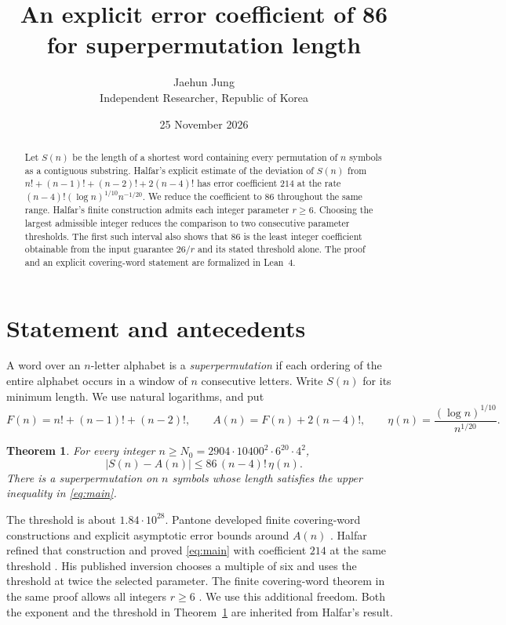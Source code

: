 \documentclass[11pt]{article}
\title{An explicit error coefficient of 86\\for superpermutation length}
\author{Jaehun Jung\\[4pt]{\small Independent Researcher, Republic of Korea}}
\date{25 November 2026}
\newtheorem{theorem}{Theorem}
\begin{document}
\maketitle

\begin{abstract}
Let \(S(n)\) be the length of a shortest word containing every permutation of \(n\) symbols as a contiguous substring. Halfar's explicit estimate of the deviation of \(S(n)\) from \(n!+(n-1)!+(n-2)!+2(n-4)!\) has error coefficient \(214\) at the rate \((n-4)!(\log n)^{1/10}n^{-1/20}\). We reduce the coefficient to \(86\) throughout the same range. Halfar's finite construction admits each integer parameter \(r\ge6\). Choosing the largest admissible integer reduces the comparison to two consecutive parameter thresholds. The first such interval also shows that \(86\) is the least integer coefficient obtainable from the input guarantee \(26/r\) and its stated threshold alone. The proof and an explicit covering-word statement are formalized in Lean~4.
\end{abstract}

\section{Statement and antecedents}
A word over an \(n\)-letter alphabet is a \emph{superpermutation} if each ordering of the entire alphabet occurs in a window of \(n\) consecutive letters. Write \(S(n)\) for its minimum length. We use natural logarithms, and put
\[
 F(n)=n!+(n-1)!+(n-2)!,\qquad A(n)=F(n)+2(n-4)!,
 \qquad \eta(n)=\frac{(\log n)^{1/10}}{n^{1/20}}.
\]
\begin{theorem}\label{thm:main}
For every integer \(n\ge N_0=2904\cdot10400^2\cdot6^{20}\cdot4^2\),
\begin{equation}\label{eq:main}
       |S(n)-A(n)|\le 86\,(n-4)!\,\eta(n).
\end{equation}
There is a superpermutation on \(n\) symbols whose length satisfies the upper inequality in \eqref{eq:main}.
\end{theorem}

The threshold is about \(1.84\cdot10^{28}\). Pantone developed finite covering-word constructions and explicit asymptotic error bounds around \(A(n)\) \cite{pantone}. Halfar refined that construction and proved \eqref{eq:main} with coefficient \(214\) at the same threshold \cite{halfar}. His published inversion chooses a multiple of six and uses the threshold at twice the selected parameter. The finite covering-word theorem in the same proof allows all integers \(r\ge6\) \cite{formal}. We use this additional freedom. Both the exponent and the threshold in Theorem~\ref{thm:main} are inherited from Halfar's result.
\end{document}
